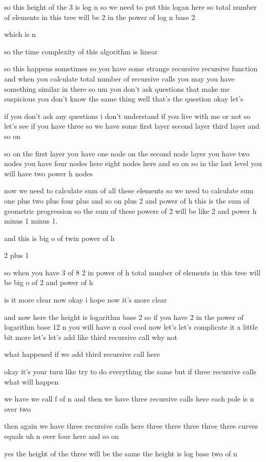 so this height of the 3 is log n so we need to put this logan here so total number of elements in this tree will be 2 in the power of log n base 2

which is n

so the time complexity of this algorithm is linear

so this happens sometimes so you have some strange recursive recursive function and when you calculate total number of recursive calls you may you have something similar in there so um you don't ask questions that make me suspicious you don't know the same thing well that's the question okay let's

if you don't ask any questions i don't understand if you live with me or not so let's see if you have three so we have some first layer second layer third layer and so on

so on the first layer you have one node on the second node layer you have two nodes you have four nodes here eight nodes here and so on so in the last level you will have two power h nodes

now we need to calculate sum of all these elements so we need to calculate sum one plus two plus four plus and so on plus 2 and power of h this is the sum of geometric progression so the sum of these powers of 2 will be like 2 and power h minus 1 minus 1.

and this is big o of twin power of h

2 plus 1

so when you have 3 of 8 2 in power of h total number of elements in this tree will be big o of 2 and power of h

is it more clear now okay i hope now it's more clear

and now here the height is logarithm base 2 so if you have 2 in the power of logarithm base 12 n you will have n cool cool now let's let's complicate it a little bit more let's let's add like third recursive call why not

what happened if we add third recursive call here

okay it's your turn like try to do everything the same but if three recursive calls what will happen

we have we call f of n and then we have three recursive calls here each pole is n over two

then again we have three recursive calls here three three three three three curves equals uh n over four here and so on

yes the height of the three will be the same the height is log base two of n

